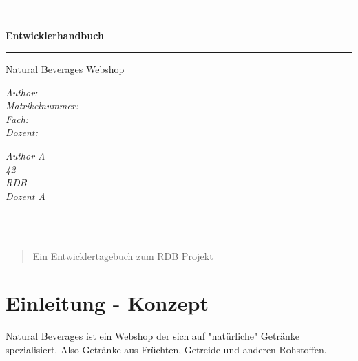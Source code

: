 \documentclass[a4paper, 11pt]{article}
\begin{document}
\newpage


\begin{verbatim}




\end{verbatim}
\begin{center}


\newcommand{\HRule}{\rule{\linewidth}{0.5mm}}
\HRule \\[0.4cm]
{ \huge \bfseries Entwicklerhandbuch}
\HRule

\Large{Natural Beverages Webshop} \\[1cm]

\begin{minipage}{0.55\textwidth}
\begin{flushleft} \large
\emph{Author:} \\
\emph{Matrikelnummer:} \\
\emph{Fach:} \\
\emph{Dozent:}
\end{flushleft}
\end{minipage}
\hfill
\begin{minipage}{0.4\textwidth}
\begin{flushright} \large
\emph{Author \textsc{A}} \\
\emph{42} \\
\emph{RDB} \\
\emph{Dozent \textsc{A}}
\end{flushright}
\end{minipage}
\end{center}
\begin{verbatim}



\end{verbatim}

\begin{abstract}
\noindent %
Ein Entwicklertagebuch zum RDB Projekt \\ [1cm]
\end{abstract}

\newpage

\tableofcontents
\listoffigures

\newpage
\section{Einleitung - Konzept}
Natural Beverages ist ein Webshop der sich auf "natürliche" Getränke spezialisiert. Also Getränke aus Früchten, Getreide und anderen Rohstoffen. \\ 
\end{document}
